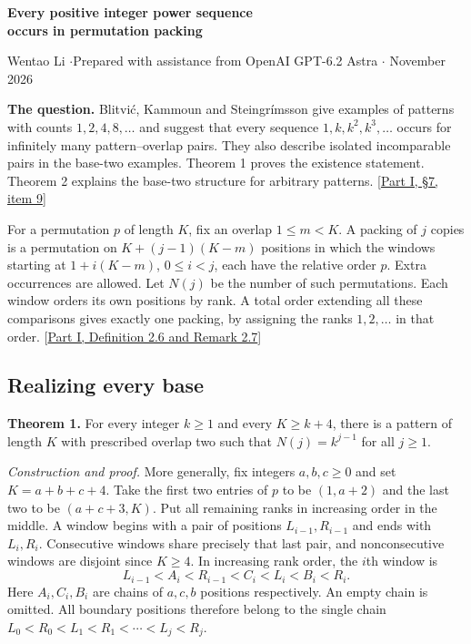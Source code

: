 \documentclass[11pt]{article}
\begin{document}
\begin{center}
{\Large\bfseries Every positive integer power sequence\\[2pt] occurs in permutation packing}\par
\small Wentao Li \enspace$\cdot$\enspace Prepared with assistance from OpenAI GPT-6.2 Astra \enspace$\cdot$ November 2026
\end{center}

\textbf{The question.}
Blitvi\'c, Kammoun and Steingr\'imsson give examples of patterns with counts $1,2,4,8,\ldots$ and suggest that every sequence $1,k,k^2,k^3,\ldots$ occurs for infinitely many pattern--overlap pairs. They also describe isolated incomparable pairs in the base-two examples. Theorem 1 proves the existence statement. Theorem 2 explains the base-two structure for arbitrary patterns. [\href{https://arxiv.org/html/2610.29846v1\#S7}{Part I, \S7, item 9}]

For a permutation $p$ of length $K$, fix an overlap $1\le m<K$. A packing of $j$ copies is a permutation on $K+(j-1)(K-m)$ positions in which the windows starting at $1+i(K-m)$, $0\le i<j$, each have the relative order $p$. Extra occurrences are allowed. Let $N(j)$ be the number of such permutations. Each window orders its own positions by rank. A total order extending all these comparisons gives exactly one packing, by assigning the ranks $1,2,\ldots$ in that order. [\href{https://arxiv.org/html/2610.29846v1\#S2.SS1}{Part I, Definition 2.6 and Remark 2.7}]

\subsection*{Realizing every base}
\textbf{Theorem 1.}
For every integer $k\ge1$ and every $K\ge k+4$, there is a pattern of length $K$ with prescribed overlap two such that $N(j)=k^{j-1}$ for all $j\ge1$.

\textit{Construction and proof.}
More generally, fix integers $a,b,c\ge0$ and set $K=a+b+c+4$. Take the first two entries of $p$ to be $(1,a+2)$ and the last two to be $(a+c+3,K)$. Put all remaining ranks in increasing order in the middle. A window begins with a pair of positions $L_{i-1},R_{i-1}$ and ends with $L_i,R_i$. Consecutive windows share precisely that last pair, and nonconsecutive windows are disjoint since $K\ge4$. In increasing rank order, the $i$th window is
\[
        L_{i-1}< A_i < R_{i-1} < C_i < L_i < B_i < R_i .
\]
Here $A_i,C_i,B_i$ are chains of $a,c,b$ positions respectively. An empty chain is omitted. All boundary positions therefore belong to the single chain $L_0<R_0<L_1<R_1<\cdots<L_j<R_j$.
\end{document}

